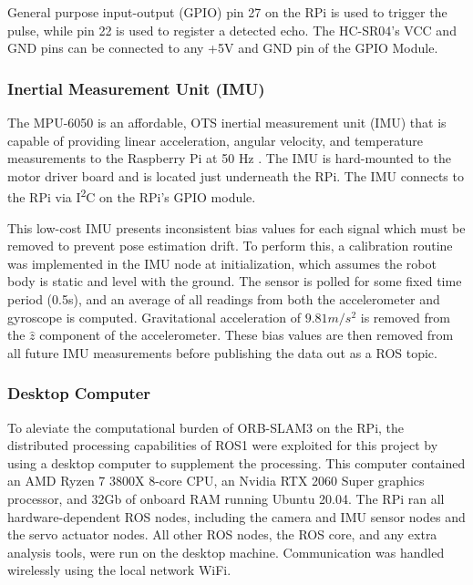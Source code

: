 General purpose input-output (GPIO) pin 27 on the RPi is used to trigger the pulse, while pin 22 is used to register a detected echo. The HC-SR04's VCC and GND pins can be connected to any +5V and GND pin of the GPIO Module.

\subsubsection{ Inertial Measurement Unit (IMU)}
The MPU-6050 is an affordable, OTS inertial measurement unit (IMU) that is capable of providing linear acceleration, angular velocity, and temperature measurements to the Raspberry Pi at 50 Hz \cite{mpu6050}.  The IMU is hard-mounted to the motor driver board and is located just underneath the RPi. The IMU connects to the RPi via I\textsuperscript{2}C on the RPi's GPIO module.

This low-cost IMU presents inconsistent bias values for each signal which must be removed to prevent pose estimation drift. To perform this, a calibration routine was implemented in the IMU node at initialization, which assumes the robot body is static and level with the ground. The sensor is polled for some fixed time period (0.5s), and an average of all readings from both the accelerometer and gyroscope is computed. Gravitational acceleration of $9.81 m/s^2$ is removed from the $\hat{z}$ component of the accelerometer. These bias values are then removed from all future IMU measurements before publishing the data out as a ROS topic.

\subsubsection{ Desktop Computer }
To aleviate the computational burden of ORB-SLAM3 on the RPi, the distributed processing capabilities of ROS1 were exploited for this project by using a desktop computer to supplement the processing. This computer contained an AMD Ryzen 7 3800X 8-core CPU, an Nvidia RTX 2060 Super graphics processor, and 32Gb of onboard RAM running Ubuntu 20.04. The RPi ran all hardware-dependent ROS nodes, including the camera and IMU sensor nodes and the servo actuator nodes. All other ROS nodes, the ROS core, and any extra analysis tools, were run on the desktop machine. Communication was handled wirelessly using the local network WiFi.